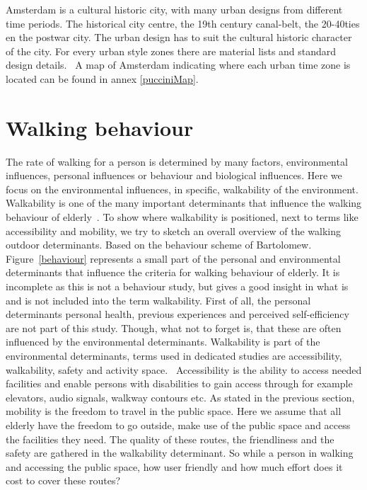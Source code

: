 Amsterdam is a cultural historic city, with many urban designs from different time periods. The historical city centre, the 19th century canal-belt, the 20-40ties en the postwar city. The urban design has to suit the cultural historic character of the city. For every urban style zones there are material lists and standard design details.~\cite{puccini2014} A map of Amsterdam indicating where each urban time zone is located can be found in annex \ref{pucciniMap}.
	
\section{Walking behaviour}\label{walking}
The rate of walking for a person is determined by many factors, environmental influences, personal influences or behaviour and biological influences. Here we focus on the environmental influences, in specific, walkability of the environment. Walkability is one of the many important determinants that influence the walking behaviour of elderly~\cite{Vine2012}. To show where walkability is positioned, next to terms like accessibility and mobility, we try to sketch an overall overview of the walking outdoor determinants. Based on the behaviour scheme of Bartolomew.~\cite{Bartholmew2011} Figure~\ref{behaviour} represents a small part of the personal and environmental determinants that influence the criteria for walking behaviour of elderly. It is incomplete as this is not a behaviour study, but gives a good insight in what is and is not included into the term walkability. First of all, the personal determinants personal health, previous experiences and perceived self-efficiency are not part of this study. Though, what not to forget is, that these are often influenced by the environmental determinants. Walkability is part of the environmental determinants, terms used in dedicated studies are accessibility, walkability, safety and activity space.~\cite{Vine2012} Accessibility is the ability to access needed facilities and enable persons with disabilities to gain access through for example elevators, audio signals, walkway contours etc.
As stated in the previous section, mobility is the freedom to travel in the public space. Here we assume that all elderly have the freedom to go outside, make use of the public space and access the facilities they need. The quality of these routes, the friendliness and the safety are gathered in the walkability determinant. So while a person in walking and accessing the public space, how user friendly and how much effort does it cost to cover these routes?


